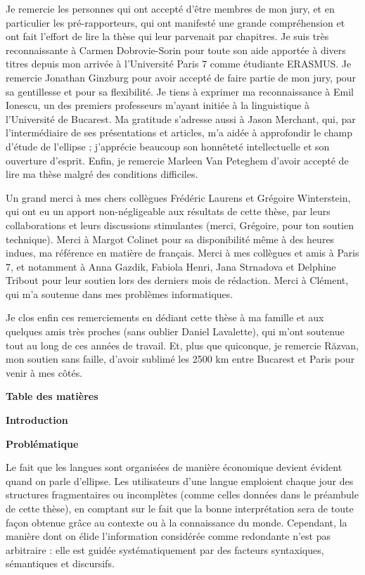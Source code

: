 Je remercie les personnes qui ont accepté d'être membres de mon jury, et en particulier les pré-rapporteurs, qui ont manifesté une grande compréhension et ont fait l'effort de lire la thèse qui leur parvenait par chapitres. Je suis très reconnaissante à Carmen Dobrovie-Sorin pour toute son aide apportée à divers titres depuis mon arrivée à l'Université Paris 7 comme étudiante ERASMUS. Je remercie Jonathan Ginzburg pour avoir accepté de faire partie de mon jury, pour sa gentillesse et pour sa flexibilité. Je tiens à exprimer ma reconnaissance à Emil Ionescu, un des premiers professeurs m'ayant initiée à la linguistique à l'Université de Bucarest. Ma gratitude s'adresse aussi à Jason Merchant, qui, par l'intermédiaire de ses présentations et articles, m'a aidée à approfondir le champ d'étude de l'ellipse ; j'apprécie beaucoup son honnêteté intellectuelle et son ouverture d'esprit. Enfin, je remercie Marleen Van Peteghem d'avoir accepté de lire ma thèse malgré des conditions difficiles.  

Un grand merci à mes chers collègues Frédéric Laurens et Grégoire Winterstein, qui ont eu un apport non-négligeable aux résultats de cette thèse, par leurs collaborations et leurs discussions stimulantes (merci, Grégoire, pour ton soutien technique). Merci à Margot Colinet pour sa disponibilité même à des heures indues, ma référence en matière de français. Merci à mes collègues et amis à Paris 7, et notamment à Anna Gazdik, Fabiola Henri, Jana Strnadova et Delphine Tribout pour leur soutien lors des derniers mois de rédaction. Merci à Clément, qui m'a soutenue dans mes problèmes informatiques.

Je clos enfin ces remerciements en dédiant cette thèse à ma famille et aux quelques amis très proches (sans oublier Daniel Lavalette), qui m'ont soutenue tout au long de ces années de travail. Et, plus que quiconque, je remercie Răzvan, mon soutien sans faille, d'avoir sublimé les 2500 km entre Bucarest et Paris pour venir à mes côtés.


{\bfseries
Table des matières}


 
{\bfseries
Introduction
}

{\bfseries
Problématique}

Le fait que les langues sont organisées de manière économique devient évident quand on parle d'ellipse. Les utilisateurs d'une langue emploient chaque jour des structures fragmentaires ou incomplètes (comme celles données dans le préambule de cette thèse), en comptant sur le fait que la bonne interprétation sera de toute façon obtenue grâce au contexte ou à la connaissance du monde. Cependant, la manière dont on élide l'information considérée comme redondante n'est pas arbitraire : elle est guidée systématiquement par des facteurs syntaxiques, sémantiques et discursifs. 


